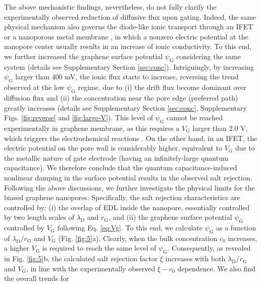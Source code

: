 \documentclass[journal=langd5,email=true, hyperref=true, keywords=false]{achemso}
\begin{document}
The above mechanistic findings, nevertheless, do not fully clarify the
experimentally observed reduction of diffusive flux upon
gating. Indeed, the same physical mechanism also governs 
the 
{ diode-like ionic
transport through an IFET  \cite{Nam_2009,Lee_2015,Feng_2016}
or a nanoporous metal membrane \cite{mccurry2017electrolyte}},
in which a nonzero electric potential at
the nanopore center usually results in an increase of ionic
conductivity. To this end, we
further increased the graphene surface potential $\psi_{\mathrm{G}}$
considering the same system (details see Supplementary Section
\ref{sec:conc}). Intriguingly, by increasing
$\psi_{\mathrm{G}}$ larger than 400 mV, the ionic flux starts to
increase, reversing the trend observed at the low $\psi_{\mathrm{G}}$
regime, due to (i) the drift flux become dominant over diffusion flux
and (ii) the concentration near the pore edge (preferred path) greatly
increases (details see Supplementary Section \ref{sec:conc},
Supplementary Figs. \ref{fig:reverse} and
\ref{fig:large-V}). This level of $\psi_{\mathrm{G}}$ cannot be
reached experimentally in graphene membrane, as this requires a
$V_{\mathrm{G}}$ larger than 2.0 V, which triggers the electrochemical
reactions \cite{Toh_2011}. On the other hand, in an IFET, the electric
potential on the pore wall is considerably higher, equivalent to
$V_{\mathrm{G}}$ due to the metallic nature of gate electrode (having
an infinitely-large quantum capacitance). We therefore conclude that
the quantum capacitance-induced nonlinear damping in the surface
potential results in the observed salt rejection.  Following the above
discussions, we further investigate the physical limits for the biased
graphene nanopores. Specifically, the salt rejection characteristics
are controlled by: (i) the overlap of EDL inside the nanopore,
essentially controlled by two length scales of $\lambda_{\mathrm{D}}$
and $r_{\mathrm{G}}$, and (ii) the graphene surface potential
$\psi_{\mathrm{G}}$ controlled by $V_{\mathrm{G}}$ following
Eq. \eqref{eq:Vg}. To this end, we calculate $\psi_{\mathrm{G}}$ as a
function of $\lambda_{\mathrm{D}} / r_{\mathrm{G}}$ and
$V_{\mathrm{G}}$ (Fig. \ref{fig:5}a). Clearly, when the bulk
concentration $c_{0}$ increases, a higher $V_{\mathrm{G}}$ is required
to reach the same level of $\psi_{\mathrm{G}}$. Consequently, as
revealed in Fig. \ref{fig:5}b, the calculated salt rejection factor
$\xi$ increases with both $\lambda_{\mathrm{D}} / r_{\mathrm{G}}$ and
$V_{\mathrm{G}}$, in line with the experimentally observed
$\xi - c_{0}$ dependence. We also find the overall trends for
\end{document}
